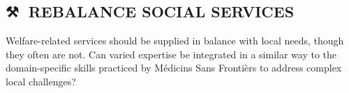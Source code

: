\subsection*{⚒💎 REBALANCE SOCIAL SERVICES{\hfill \motor}}\label{pat:rebalance-social-services}

Welfare-related services should be supplied in balance with local needs, though they often are not. Can varied expertise be integrated in a similar way to the domain-specific skills practiced by Médicins Sans Frontièrs to address complex local challenges?
